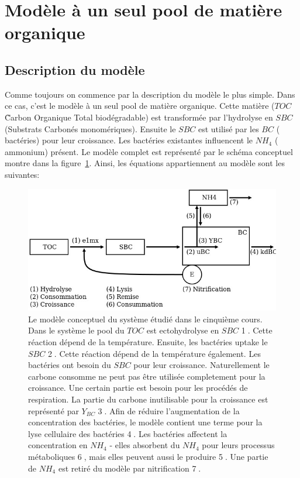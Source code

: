 \section{Mod\`ele \`a un seul pool de matière organique}
\subsection{Description du mod\`ele}

\par{
Comme toujours on commence par la description du modèle le plus simple. Dans ce cas, c'est le modèle
\`a un seul pool de matière organique. Cette matière ($TOC$ \~ Carbon Organique Total biodégradable)
est transformée par l'hydrolyse en $SBC$ (Substrats Carbonés monomériques). Ensuite le $SBC$ est
utilisé par les $BC$ (~ bactéries) pour leur croissance. Les bactéries existantes influencent le $NH_4$
(~ ammonium) présent. Le modèle complet est représenté par le schéma conceptuel montre dans la
figure~\ref{fig:partie1concModel}. Ainsi, les équations appartiennent au modèle sont les suivantes:
}

\begin{figure}[h!]
  \includegraphics[width=\textwidth]{partie1/scan1.jpg}
  \caption{Le modèle conceptuel du système étudié dans le cinquième cours. Dans le système le pool du
$TOC$ est ectohydrolyse en $SBC$ \textcircled{1}. Cette réaction dépend de la température. Ensuite, 
les bactéries uptake le $SBC$ \textcircled{2}. Cette réaction dépend de la température également. Les
bactéries ont besoin du $SBC$ pour leur croissance. Naturellement le carbone consomme ne peut pas être
utilisée completement pour la croissance. Une certain partie est besoin pour les procédés de
respiration. La partie du carbone inutilisable pour la croissance est représenté par $Y_{BC}$ \textcircled{3}.
Afin de réduire l'augmentation de la concentration des bactéries, le modèle contient une terme pour la lyse
cellulaire des bactéries \textcircled{4}. Les bactéries affectent la concentration en $NH_4$ -
elles absorbent du $NH_4$ pour leurs processus métaboliques \textcircled{6}, mais elles peuvent aussi le
produire \textcircled{5}. Une partie de $NH_4$ est retiré du modèle par nitrification \textcircled{7}.
}
  \label{fig:partie1concModel}
\end{figure}

